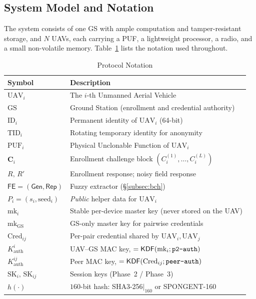 \documentclass[11pt,a4paper]{article}
\begin{document}
\subsection{System Model and Notation}

The system consists of one GS with ample computation and tamper-resistant
storage, and $N$ UAVs, each carrying a PUF, a lightweight processor, a radio,
and a small non-volatile memory. Table~\ref{tab:notation} lists the notation
used throughout.

\begin{table}[H]
\centering
\caption{Protocol Notation}
\label{tab:notation}
\begin{tabular}{@{}ll@{}}
\toprule
\textbf{Symbol} & \textbf{Description} \\
\midrule
$\text{UAV}_i$ & The $i$-th Unmanned Aerial Vehicle \\
$\text{GS}$ & Ground Station (enrollment and credential authority) \\
$\text{ID}_i$ & Permanent identity of $\text{UAV}_i$ (64-bit) \\
$\text{TID}_i$ & Rotating temporary identity for anonymity \\
$\text{PUF}_i$ & Physical Unclonable Function of $\text{UAV}_i$ \\
$\bm{C}_i$ & Enrollment challenge block $(C_i^{(1)},\dots,C_i^{(L)})$ \\
$R,\,R'$ & Enrollment response; noisy field response \\
$\mathsf{FE}=(\mathsf{Gen},\mathsf{Rep})$ & Fuzzy extractor (\S\ref{subsec:bch}) \\
$P_i=(s_i,\text{seed}_i)$ & \emph{Public} helper data for $\text{UAV}_i$ \\
$\text{mk}_i$ & Stable per-device master key (never stored on the UAV) \\
$\text{mk}_{\text{GS}}$ & GS-only master key for pairwise credentials \\
$\text{Cred}_{ij}$ & Per-pair credential shared by $\text{UAV}_i,\text{UAV}_j$ \\
$K^{i}_{\text{auth}}$ & UAV--GS MAC key, $=\mathsf{KDF}(\text{mk}_i;\texttt{p2\text{-}auth})$ \\
$K^{ij}_{\text{auth}}$ & Peer MAC key, $=\mathsf{KDF}(\text{Cred}_{ij};\texttt{peer\text{-}auth})$ \\
$\text{SK}_i,\,\text{SK}_{ij}$ & Session keys (Phase~2 / Phase~3) \\
$h(\cdot)$ & $160$-bit hash: SHA3-256$|_{160}$ or SPONGENT-160 \\

\end{tabular}
\end{table}
\end{document}
